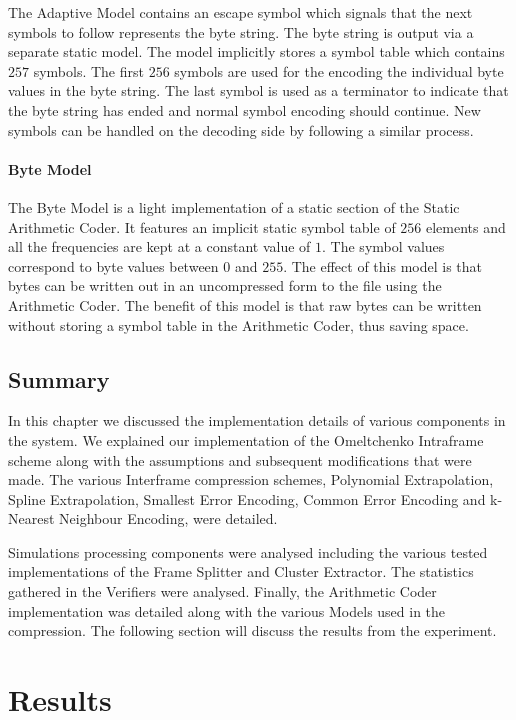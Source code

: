 \documentclass[a4paper,11pt]{report}
\begin{document}
The Adaptive Model contains an escape symbol which signals that the next symbols to follow represents the byte string. The byte string is output via a separate static model. The model implicitly stores a symbol table which contains $257$ symbols. The first $256$ symbols are used for the encoding the individual byte values in the byte string. The last symbol is used as a terminator to indicate that the byte string has ended and normal symbol encoding should continue. New symbols can be handled on the decoding side by following a similar process.

\subsubsection{Byte Model}

The Byte Model is a light implementation of a static section of the Static Arithmetic Coder. It features an implicit static symbol table of $256$ elements and all the frequencies are kept at a constant value of $1$. The symbol values correspond to byte values between $0$ and $255$. The effect of this model is that bytes can be written out in an uncompressed form to the file using the Arithmetic Coder. The benefit of this model is that raw bytes can be written without storing a symbol table in the Arithmetic Coder, thus saving space. 

\section{Summary}

In this chapter we discussed the implementation details of various components in the system. We explained our implementation of the Omeltchenko Intraframe scheme along with the assumptions and subsequent modifications that were made. The various Interframe compression schemes, Polynomial Extrapolation, Spline Extrapolation, Smallest Error Encoding, Common Error Encoding and k-Nearest Neighbour Encoding, were detailed. 

Simulations processing components were analysed including the various tested implementations of the Frame Splitter and Cluster Extractor. The statistics gathered in the Verifiers were analysed. Finally, the Arithmetic Coder implementation was detailed along with the various Models used in the compression. The following section will discuss the results from the experiment.

\chapter{Results}
\end{document}
